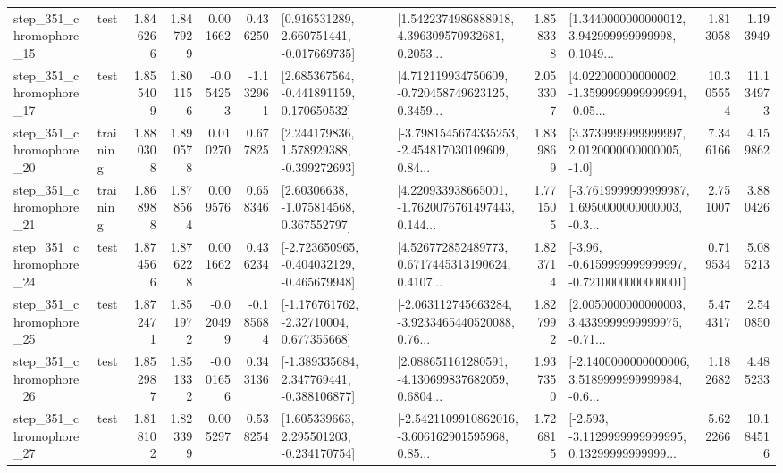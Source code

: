 \begin{tabular}{llrrrrllrlrr}
  step\_351\_chromophore\_15 &      test &      1.846266 &    1.847929 &      0.001662 &  0.436250 &    [0.916531289, 2.660751441, -0.017669735] &  [1.5422374986888918, 4.396309570932681, 0.2053... &       1.858338 &  [1.3440000000000012, 3.942999999999998, 0.1049... &            1.813058 &          1.193949 \\
  step\_351\_chromophore\_17 &      test &      1.855409 &    1.801156 &     -0.054253 & -1.132961 &    [2.685367564, -0.441891159, 0.170650532] &  [4.712119934750609, -0.720458749623125, 0.3459... &       2.053307 &  [4.022000000000002, -1.3599999999999994, -0.05... &           10.305554 &         11.134973 \\
  step\_351\_chromophore\_20 &  training &      1.880308 &    1.890578 &      0.010270 &  0.677825 &    [2.244179836, 1.578929388, -0.399272693] &  [-3.7981545674335253, -2.454817030109609, 0.84... &       1.839869 &     [3.3739999999999997, 2.0120000000000005, -1.0] &            7.346166 &          4.159862 \\
  step\_351\_chromophore\_21 &  training &      1.868988 &    1.878564 &      0.009576 &  0.658346 &     [2.60306638, -1.075814568, 0.367552797] &  [4.220933938665001, -1.7620076761497443, 0.144... &       1.771505 &  [-3.7619999999999987, 1.6950000000000003, -0.3... &            2.751007 &          3.880426 \\
  step\_351\_chromophore\_24 &      test &      1.874566 &    1.876228 &      0.001662 &  0.436234 &  [-2.723650965, -0.404032129, -0.465679948] &  [4.526772852489773, 0.6717445313190624, 0.4107... &       1.823714 &  [-3.96, -0.6159999999999997, -0.7210000000000001] &            0.719534 &          5.085213 \\
  step\_351\_chromophore\_25 &      test &      1.872471 &    1.851972 &     -0.020499 & -0.185684 &    [-1.176761762, -2.32710004, 0.677355668] &  [-2.063112745663284, -3.9233465440520088, 0.76... &       1.827992 &  [2.0050000000000003, 3.4339999999999975, -0.71... &            5.474317 &          2.540850 \\
  step\_351\_chromophore\_26 &      test &      1.852987 &    1.851332 &     -0.001656 &  0.343136 &   [-1.389335684, 2.347769441, -0.388106877] &  [2.088651161280591, -4.130699837682059, 0.6804... &       1.937350 &  [-2.1400000000000006, 3.5189999999999984, -0.6... &            1.182682 &          4.485233 \\
  step\_351\_chromophore\_27 &      test &      1.818102 &    1.823399 &      0.005297 &  0.538254 &    [1.605339663, 2.295501203, -0.234170754] &  [-2.5421109910862016, -3.606162901595968, 0.85... &       1.726815 &  [-2.593, -3.1129999999999995, 0.13299999999999... &            5.622266 &         10.184516 \\

\end{tabular}
